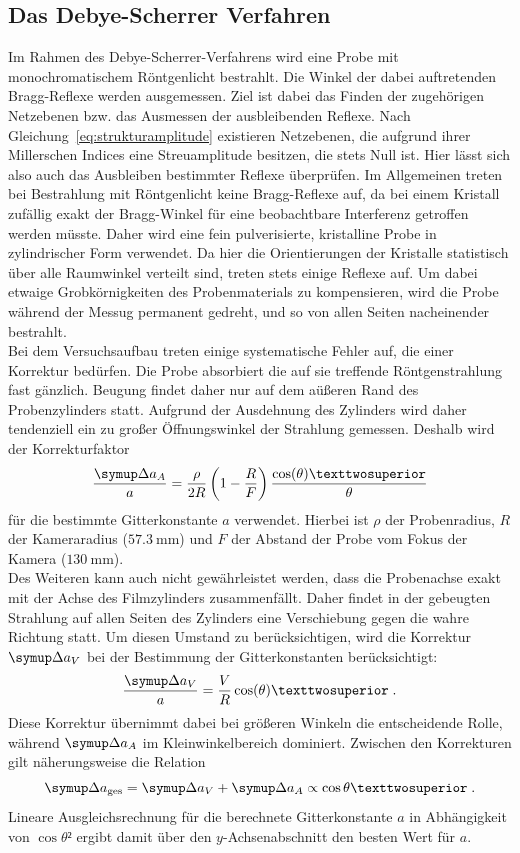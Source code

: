 \subsection{Das Debye-Scherrer Verfahren}
%
Im Rahmen des Debye-Scherrer-Verfahrens wird eine Probe mit monochromatischem Röntgenlicht bestrahlt. Die Winkel der dabei auftretenden
Bragg-Reflexe werden ausgemessen. Ziel ist dabei das Finden der zugehörigen Netzebenen bzw. das Ausmessen der ausbleibenden Reflexe. Nach
Gleichung~\eqref{eq:strukturamplitude} existieren Netzebenen, die aufgrund ihrer Millerschen Indices eine Streuamplitude besitzen, die
stets Null ist. Hier lässt sich also auch das Ausbleiben bestimmter Reflexe überprüfen. Im Allgemeinen treten bei Bestrahlung mit
Röntgenlicht keine Bragg-Reflexe auf, da bei einem Kristall zufällig exakt der Bragg-Winkel für eine beobachtbare Interferenz getroffen
werden müsste. Daher wird eine fein pulverisierte, kristalline Probe in zylindrischer Form verwendet. Da hier die Orientierungen der
Kristalle statistisch über alle Raumwinkel verteilt sind, treten stets einige Reflexe auf. Um dabei etwaige Grobkörnigkeiten des
Probenmaterials zu kompensieren, wird die Probe während der Messug permanent gedreht, und so von allen Seiten nacheinender bestrahlt.\\
Bei dem Versuchsaufbau treten einige systematische Fehler auf, die einer Korrektur bedürfen. Die Probe absorbiert die auf sie treffende
Röntgenstrahlung fast gänzlich. Beugung findet daher nur auf dem aüßeren Rand des Probenzylinders statt. Aufgrund der Ausdehnung des
Zylinders wird daher tendenziell ein zu großer Öffnungswinkel der Strahlung gemessen. Deshalb wird der Korrekturfaktor
%
\begin{equation}
 \frac{\upD a_A}{a}=\frac{\rho}{2R}\left(1-\frac{R}{F}\right)\frac{\cos(\theta)²}{\theta}
\end{equation}
%
für die bestimmte Gitterkonstante $a$ verwendet. Hierbei ist $\rho$ der Probenradius, $R$ der Kameraradius ($\SI{57,3}{\milli\meter}$)
und $F$ der Abstand der Probe vom Fokus der Kamera ($\SI{130}{\milli\meter}$).\\
Des Weiteren kann auch nicht gewährleistet werden, dass die Probenachse exakt mit der Achse des Filmzylinders zusammenfällt. Daher
findet in der gebeugten Strahlung auf allen Seiten des Zylinders eine Verschiebung gegen die wahre Richtung statt. Um diesen
Umstand zu berücksichtigen, wird die Korrektur $\upD a_V$ bei der Bestimmung der Gitterkonstanten berücksichtigt:
%
\begin{equation}
  \frac{\upD a_V}{a}=\frac{V}{R}\cos(\theta)² \; .
\end{equation}
%
Diese Korrektur übernimmt dabei bei größeren Winkeln die entscheidende Rolle, während $\upD a_A$ im Kleinwinkelbereich dominiert.
Zwischen den Korrekturen gilt näherungsweise die Relation
%
\begin{equation}
  \upD a_\text{ges}=\upD a_V+\upD a_A\propto\cos{\theta}² \; .
\end{equation}
%
Lineare Ausgleichsrechnung für die berechnete Gitterkonstante $a$ in Abhängigkeit von $\cos{\theta}²$ ergibt damit über den
$y$-Achsenabschnitt den besten Wert für $a$.
